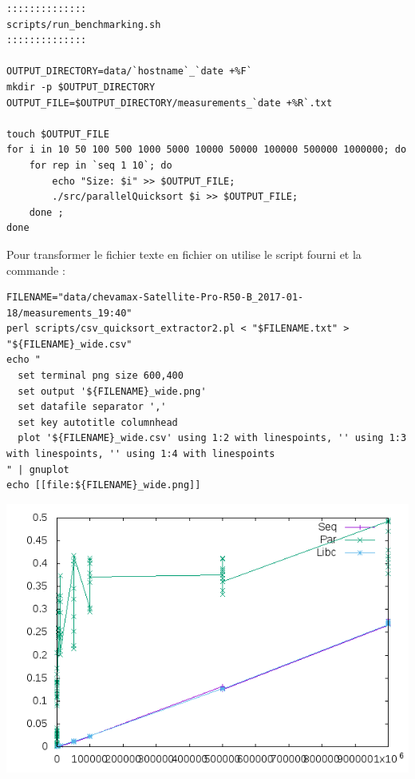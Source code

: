 \documentclass[11pt]{article}
\begin{document}
\begin{verbatim}
::::::::::::::
scripts/run_benchmarking.sh
::::::::::::::

OUTPUT_DIRECTORY=data/`hostname`_`date +%F`
mkdir -p $OUTPUT_DIRECTORY
OUTPUT_FILE=$OUTPUT_DIRECTORY/measurements_`date +%R`.txt

touch $OUTPUT_FILE
for i in 10 50 100 500 1000 5000 10000 50000 100000 500000 1000000; do
    for rep in `seq 1 10`; do
        echo "Size: $i" >> $OUTPUT_FILE;
        ./src/parallelQuicksort $i >> $OUTPUT_FILE;
    done ;
done
\end{verbatim}

Pour transformer le fichier texte en fichier on utilise le script
fourni et la commande :

\begin{verbatim}
FILENAME="data/chevamax-Satellite-Pro-R50-B_2017-01-18/measurements_19:40"
perl scripts/csv_quicksort_extractor2.pl < "$FILENAME.txt" > "${FILENAME}_wide.csv"
echo "
  set terminal png size 600,400 
  set output '${FILENAME}_wide.png'
  set datafile separator ','
  set key autotitle columnhead
  plot '${FILENAME}_wide.csv' using 1:2 with linespoints, '' using 1:3 with linespoints, '' using 1:4 with linespoints
" | gnuplot
echo [[file:${FILENAME}_wide.png]]
\end{verbatim}

\includegraphics[width=.9\linewidth]{data/chevamax-Satellite-Pro-R50-B_2017-01-18/measurements_19:40_wide.png}
\end{document}
